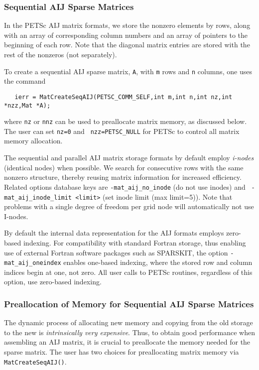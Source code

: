 \subsubsection{Sequential AIJ Sparse Matrices}

In the PETSc AIJ matrix formats, we store the nonzero elements
by rows, along with an array of corresponding column numbers and
an array of pointers to the beginning of each row.  Note that the
diagonal matrix entries are stored with the rest of the nonzeros (not
separately). 

To create a sequential AIJ sparse matrix, {\tt A}, 
 with {\tt m} rows and {\tt n} columns,
one uses the command
\begin{verbatim}
   ierr = MatCreateSeqAIJ(PETSC_COMM_SELF,int m,int n,int nz,int *nzz,Mat *A);
\end{verbatim}
where {\tt nz} or {\tt nnz} can be used to preallocate matrix memory,
as discussed below. The user can set {\tt nz=0} and {\tt
nzz=PETSC\_NULL} for PETSc to control all matrix memory allocation.

The sequential and parallel AIJ matrix storage formats by default
employ {\em i-nodes} (identical nodes) when possible.  We search for
consecutive rows with the same nonzero structure, thereby reusing
matrix information for increased efficiency.  Related options database
keys are {\tt -mat\_aij\_no\_inode} (do not use inodes) and {\tt
-mat\_aij\_inode\_limit <limit>} (set inode limit (max limit=5)).
Note that problems with a single degree of freedom per grid node
will automatically not use I-nodes.

By default the internal data representation for the AIJ formats employs
zero-based indexing.  For compatibility with standard Fortran storage,
thus enabling use of external Fortran software packages such as
SPARSKIT,  the option {\tt -mat\_aij\_oneindex}
 enables one-based indexing, where the stored
row and column indices begin at one, not zero.  All user calls to
PETSc routines, regardless of this option, use zero-based indexing.

\subsubsection{Preallocation of Memory for Sequential AIJ Sparse Matrices}

The dynamic process of allocating new memory and copying from the old
storage to the new is {\em intrinsically very expensive}.  Thus, to
obtain good performance when assembling an AIJ matrix, it is crucial
to preallocate the memory needed for the sparse matrix.  The user has
two choices for preallocating matrix memory via {\tt
MatCreateSeqAIJ()}. 

